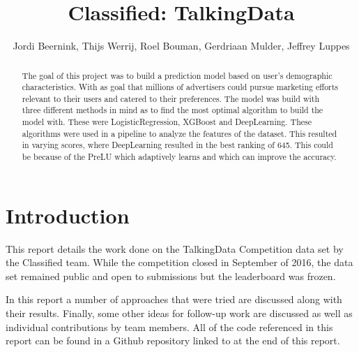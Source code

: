 \documentclass[runningheads,a4paper]{llncs}
\begin{document}
\mainmatter 

\title{Classified: TalkingData}


\author{Jordi Beernink, Thijs Werrij, Roel Bouman, Gerdriaan Mulder, Jeffrey Luppes}



\tocauthor{{}}

\maketitle

\begin{abstract}
The goal of this project was to build a prediction model based on user's demographic characteristics. With as goal that millions of advertisers could pursue marketing efforts relevant to their users and catered to their preferences. The model was build with three different methods in mind as to find the most optimal algorithm to build the model with. These were LogisticRegression, XGBoost and DeepLearning. These algorithms were used in a pipeline to analyze the features of the dataset. This resulted in varying scores, where DeepLearning resulted in the best ranking of 645. This could be because of the PreLU which adaptively learns and which can improve the accuracy. 
\end{abstract}

\medskip

\begingroup
\let\clearpage\relax
\tableofcontents
{}
\endgroup

\medskip
\medskip

\section{Introduction}
This report details the work done on the TalkingData Competition data set by the Classified team. While the competition closed in September of 2016,  the data set remained public and open to submissions but the leaderboard was frozen.

In this report a number of approaches that were tried are discussed along with their results. Finally, some other ideas for follow-up work are discussed as well as individual contributions by team members. All of the code referenced in this report can be found in a Github repository linked to at the end of this report. 
\end{document}
